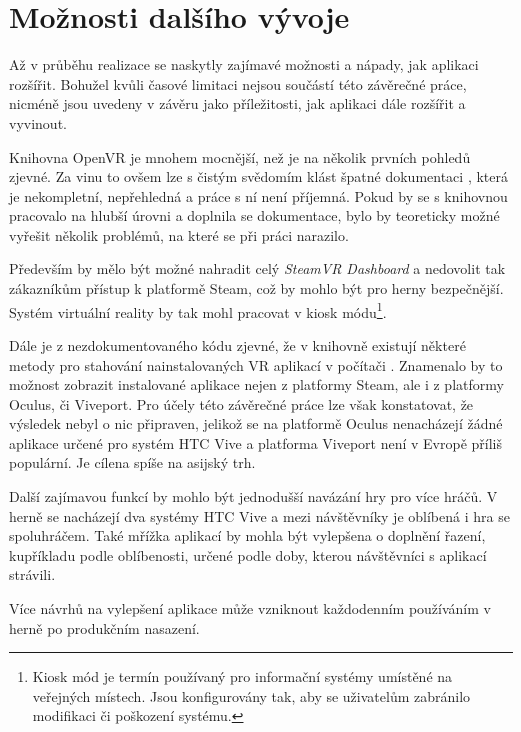\section{Možnosti dalšího
vývoje}\label{moux17enosti-dalux161uxedho-vuxfdvoje}

Až v průběhu realizace se naskytly zajímavé možnosti a nápady, jak
aplikaci rozšířit. Bohužel kvůli časové limitaci nejsou součástí této
závěrečné práce, nicméně jsou uvedeny v závěru jako příležitosti, jak
aplikaci dále rozšířit a vyvinout.

Knihovna OpenVR je mnohem mocnější, než je na několik prvních pohledů
zjevné. Za vinu to ovšem lze s čistým svědomím klást špatné dokumentaci \autocite{openvrdocs},
která je nekompletní, nepřehledná a práce s ní není příjemná. Pokud by
se s knihovnou pracovalo na hlubší úrovni a doplnila se dokumentace,
bylo by teoreticky možné vyřešit několik problémů, na které se při práci narazilo.

Především by mělo být možné nahradit celý \emph{SteamVR Dashboard} a
nedovolit tak zákazníkům přístup k platformě Steam, což by mohlo být pro
herny bezpečnější. Systém virtuální reality by tak mohl pracovat v
kiosk módu\footnote{Kiosk mód je termín používaný pro informační systémy umístěné na veřejných místech. Jsou konfigurovány tak, aby se uživatelům zabránilo modifikaci či poškození systému.}. 

Dále je z nezdokumentovaného kódu zjevné, že v
knihovně existují některé metody pro stahování nainstalovaných VR
aplikací v počítači \autocite{openvrhidden}. Znamenalo by to možnost zobrazit instalované aplikace
nejen z platformy Steam, ale i z platformy Oculus, či Viveport. Pro
účely této závěrečné práce lze však konstatovat, že výsledek nebyl o nic
připraven, jelikož se na platformě Oculus nenacházejí žádné aplikace
určené pro systém HTC Vive a platforma Viveport není v Evropě příliš
populární. Je cílena spíše na asijský trh. \autocite{viveportasia}

Další zajímavou funkcí by mohlo být jednodušší navázání hry pro více
hráčů. V herně se nacházejí dva systémy HTC Vive a mezi návštěvníky je
oblíbená i hra se spoluhráčem. Také mřížka aplikací by mohla být vylepšena o
doplnění řazení, kupříkladu podle oblíbenosti, určené podle doby, kterou
návštěvníci s aplikací strávili.

Více návrhů na vylepšení aplikace může vzniknout každodenním používáním
v herně po produkčním nasazení.
